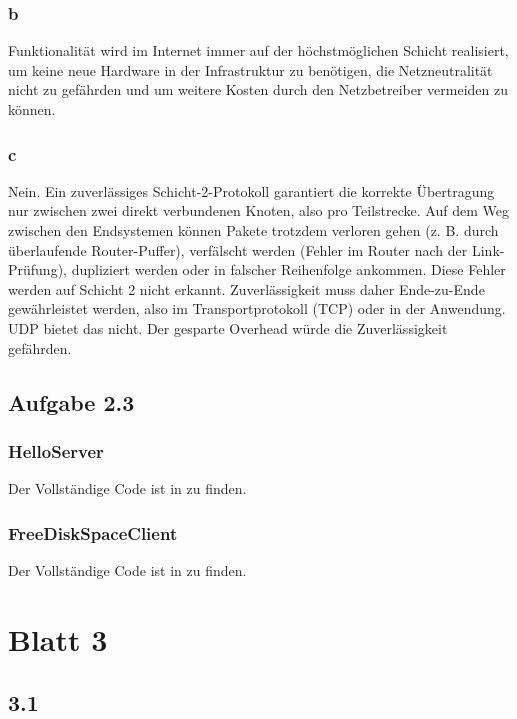 \documentclass[12pt,a4paper,oneside]{article}
\begin{document}
        \subsubsection{b}
            Funktionalität wird im Internet immer auf der höchstmöglichen Schicht realisiert, um keine neue Hardware in der Infrastruktur zu benötigen, die Netzneutralität nicht zu gefährden und um weitere Kosten durch den Netzbetreiber vermeiden zu können.

        \subsubsection{c}
            Nein. Ein zuverlässiges Schicht-2-Protokoll garantiert die korrekte Übertragung nur zwischen zwei direkt verbundenen Knoten, also pro Teilstrecke. Auf dem Weg zwischen den Endsystemen können Pakete trotzdem verloren gehen (z. B. durch überlaufende Router-Puffer), verfälscht werden (Fehler im Router nach der Link-Prüfung), dupliziert werden oder in falscher Reihenfolge ankommen. Diese Fehler werden auf Schicht 2 nicht erkannt. Zuverlässigkeit muss daher Ende-zu-Ende gewährleistet werden, also im Transportprotokoll (TCP) oder in der Anwendung. UDP bietet das nicht. Der gesparte Overhead würde die Zuverlässigkeit gefährden.

    \subsection{Aufgabe 2.3}
        \subsubsection{HelloServer}
            Der Vollständige Code ist in  zu finden.

        \subsubsection{FreeDiskSpaceClient}
            Der Vollständige Code ist in  zu finden.

\section{Blatt 3}
    \subsection{3.1}
\end{document}
